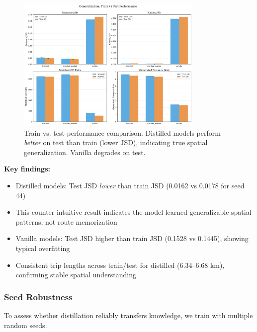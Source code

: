 \begin{figure}[h]
\centering
\includegraphics[width=0.8\textwidth]{assets/plots/hoser/train_test_comparison.pdf}
\caption{Train vs. test performance comparison. Distilled models perform \emph{better} on test than train (lower JSD), indicating true spatial generalization. Vanilla degrades on test.}
\label{fig:train-test}
\end{figure}

\textbf{Key findings:}
\begin{itemize}[noitemsep,topsep=0pt]
\item Distilled models: Test JSD \emph{lower} than train JSD (0.0162 vs 0.0178 for seed 44)
\item This counter-intuitive result indicates the model learned generalizable spatial patterns, not route memorization
\item Vanilla models: Test JSD higher than train JSD (0.1528 vs 0.1445), showing typical overfitting
\item Consistent trip lengths across train/test for distilled (6.34--6.68 km), confirming stable spatial understanding
\end{itemize}

\subsubsection{Seed Robustness}

To assess whether distillation reliably transfers knowledge, we train with multiple random seeds.

